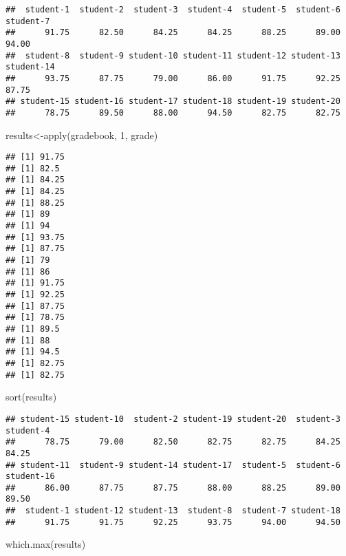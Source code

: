 \documentclass[
]{article}
\newenvironment{Shaded}{\begin{snugshade}}{\end{snugshade}}
\newcommand{\DecValTok}[1]{\textcolor[rgb]{0.00,0.00,0.81}{#1}}
\newcommand{\FunctionTok}[1]{\textcolor[rgb]{0.00,0.00,0.00}{#1}}
\newcommand{\NormalTok}[1]{#1}
\newcommand{\OtherTok}[1]{\textcolor[rgb]{0.56,0.35,0.01}{#1}}
\begin{document}
\begin{verbatim}
##  student-1  student-2  student-3  student-4  student-5  student-6  student-7 
##      91.75      82.50      84.25      84.25      88.25      89.00      94.00 
##  student-8  student-9 student-10 student-11 student-12 student-13 student-14 
##      93.75      87.75      79.00      86.00      91.75      92.25      87.75 
## student-15 student-16 student-17 student-18 student-19 student-20 
##      78.75      89.50      88.00      94.50      82.75      82.75
\end{verbatim}

\begin{Shaded}
\begin{Highlighting}[]
\NormalTok{results}\OtherTok{\textless{}{-}}\FunctionTok{apply}\NormalTok{(gradebook, }\DecValTok{1}\NormalTok{, grade)}
\end{Highlighting}
\end{Shaded}

\begin{verbatim}
## [1] 91.75
## [1] 82.5
## [1] 84.25
## [1] 84.25
## [1] 88.25
## [1] 89
## [1] 94
## [1] 93.75
## [1] 87.75
## [1] 79
## [1] 86
## [1] 91.75
## [1] 92.25
## [1] 87.75
## [1] 78.75
## [1] 89.5
## [1] 88
## [1] 94.5
## [1] 82.75
## [1] 82.75
\end{verbatim}

\begin{Shaded}
\begin{Highlighting}[]
\FunctionTok{sort}\NormalTok{(results)}
\end{Highlighting}
\end{Shaded}

\begin{verbatim}
## student-15 student-10  student-2 student-19 student-20  student-3  student-4 
##      78.75      79.00      82.50      82.75      82.75      84.25      84.25 
## student-11  student-9 student-14 student-17  student-5  student-6 student-16 
##      86.00      87.75      87.75      88.00      88.25      89.00      89.50 
##  student-1 student-12 student-13  student-8  student-7 student-18 
##      91.75      91.75      92.25      93.75      94.00      94.50
\end{verbatim}

\begin{Shaded}
\begin{Highlighting}[]
\FunctionTok{which.max}\NormalTok{(results) }
\end{Highlighting}
\end{Shaded}
\end{document}
